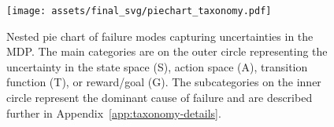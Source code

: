 \begin{figure}[!h]
    \centering
    \texttt{[image: assets/final\_svg/piechart\_taxonomy.pdf]}
    \caption{Nested pie chart of \gptfo{} \react{} failure modes capturing uncertainties in the MDP. The main categories are on the outer circle representing the uncertainty in the state space (S), action space (A), transition function (T), or reward/goal (G). The subcategories on the inner circle represent the dominant cause of failure and are described further in Appendix~\ref{app:taxonomy-details}.}
    \label{fig:piechart_taxonomy}
\end{figure}